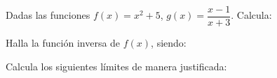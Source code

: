 \documentclass[addpoints,spanish, 12pt,a4paper]{exam}
\begin{document}
\begin{questions}
        \question[2]     Dadas las funciones $f(x)= x^2+5$,  $g(x)=\dfrac{x - 1}{x + 3}$. Calcula: 
    
        \begin{multicols}{1}
        \end{multicols}

        
        \question Halla la función inversa de $f(x)$, siendo:
        
        
        
        
        \question[3] Calcula los siguientes límites de manera justificada:
        \begin{multicols}{2}
        \begin{parts} 

\end{parts}
\end{multicols}
\end{questions}
\end{document}
